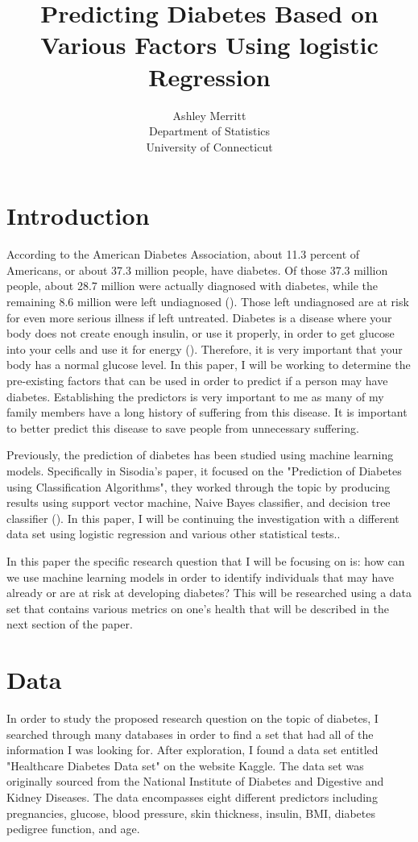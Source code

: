 \documentclass[12pt]{article}
\title{Predicting Diabetes Based on Various Factors Using logistic Regression}
\author{Ashley Merritt\\
    Department of Statistics\\
    University of Connecticut
    }
\begin{document}
\maketitle

\begin{abstract}

\end{abstract}

\section{Introduction}
\label{sec:intro}
    According to the American Diabetes Association, about 11.3 percent of Americans, or about 37.3 million people, have diabetes. Of those 37.3 million people, about 28.7 million were actually diagnosed with diabetes, while the remaining 8.6 million were left undiagnosed (\citet{CDC2022Diabetes}). Those left undiagnosed are at risk for even more serious illness if left untreated. Diabetes is a disease where your body does not create enough insulin, or use it properly, in order to get glucose into your cells and use it for energy (\cite{NIH2023Whatis}). Therefore, it is very important that your body has a normal glucose level. In this paper, I will be working to determine the pre-existing factors that can be used in order to predict if a person may have diabetes. Establishing the predictors is very important to me as many of my family members have a long history of suffering from this disease. It is important to better predict this disease to save people from unnecessary suffering. 

    Previously, the prediction of diabetes has been studied using machine learning models. Specifically in Sisodia's paper, it focused on the "Prediction of Diabetes using Classification Algorithms", they worked through the topic by producing results using support vector machine, Naive Bayes classifier, and decision tree classifier (\cite{Sisodia2018Prediction}). In this paper, I will be continuing the investigation with a different data set using logistic regression and various other statistical tests.. 

    In this paper the specific research question that I will be focusing on is: how can we use machine learning models in order to identify individuals that may have already or are at risk at developing diabetes? This will be researched using a data set that contains various metrics on one's health that will be described in the next section of the paper.

\section{Data}
\label{sec:data}
    In order to study the proposed research question on the topic of diabetes, I searched through many databases in order to find a set that had all of the information I was looking for. After exploration, I found a data set entitled "Healthcare Diabetes Data set" on the website Kaggle. The data set was originally sourced from the National Institute of Diabetes and Digestive and Kidney Diseases. The data encompasses eight different predictors including pregnancies, glucose, blood pressure, skin thickness, insulin, BMI, diabetes pedigree function, and age.
\end{document}

